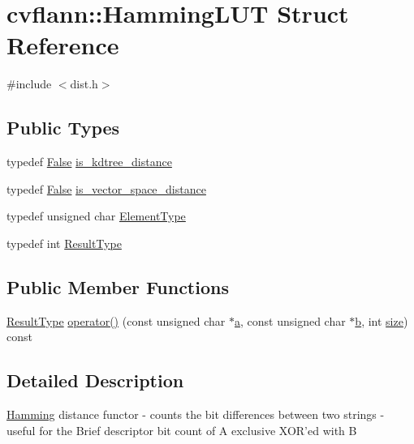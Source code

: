 \hypertarget{structcvflann_1_1HammingLUT}{\section{cvflann\-:\-:Hamming\-L\-U\-T Struct Reference}
\label{structcvflann_1_1HammingLUT}
}


{\ttfamily \#include $<$dist.\-h$>$}

\subsection*{Public Types}
\begin{DoxyCompactItemize}
\item 
typedef \hyperlink{classcvflann_1_1False}{False} \hyperlink{structcvflann_1_1HammingLUT_a079b4722221e8938f9737527e03069b3}{is\-\_\-kdtree\-\_\-distance}
\item 
typedef \hyperlink{classcvflann_1_1False}{False} \hyperlink{structcvflann_1_1HammingLUT_a31aace22379406498714791781139cd4}{is\-\_\-vector\-\_\-space\-\_\-distance}
\item 
typedef unsigned char \hyperlink{structcvflann_1_1HammingLUT_afb774f8aaf272c2806f6b0516b47d3ad}{Element\-Type}
\item 
typedef int \hyperlink{structcvflann_1_1HammingLUT_a022e0260e3ecd3a202fadf6a52cba436}{Result\-Type}
\end{DoxyCompactItemize}
\subsection*{Public Member Functions}
\begin{DoxyCompactItemize}
\item 
\hyperlink{structcvflann_1_1HammingLUT_a022e0260e3ecd3a202fadf6a52cba436}{Result\-Type} \hyperlink{structcvflann_1_1HammingLUT_ad707afb7a5c9d5ba5a730226cce45ccf}{operator()} (const unsigned char $\ast$\hyperlink{legacy_8hpp_a1031d0e0a97a340abfe0a6ab9e831045}{a}, const unsigned char $\ast$\hyperlink{legacy_8hpp_ac04272e8ca865b8fba18d36edae9fd2a}{b}, int \hyperlink{legacy_8hpp_ae97003f8d5c64cdfb99f6f2606d121b6}{size}) const 
\end{DoxyCompactItemize}


\subsection{Detailed Description}
\hyperlink{structcvflann_1_1Hamming}{Hamming} distance functor -\/ counts the bit differences between two strings -\/ useful for the Brief descriptor bit count of A exclusive X\-O\-R'ed with B 

